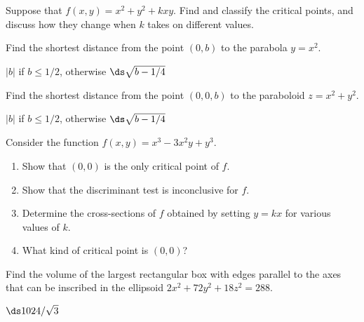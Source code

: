 \begin{enumialphparenastyle}
\begin{ex}
Suppose that $f(x,y)=x^2+y^2+kxy$. Find and classify the
  critical points, and discuss how they change when $k$ takes on
  different values.
\end{ex}

\begin{ex}
Find the shortest distance from the point $(0,b)$ to the
  parabola $y=x^2$.
\begin{sol}
$|b|$ if $b\le1/2$, otherwise $\ds\sqrt{b-1/4}$
\end{sol}
\end{ex}

\begin{ex}
Find the shortest distance from the point $(0,0,b)$ to the
  paraboloid $z=x^2+y^2$.
\begin{sol}
$|b|$ if $b\le1/2$, otherwise $\ds\sqrt{b-1/4}$
\end{sol}
\end{ex}

\begin{ex}
Consider the function $f(x,y)=x^3-3x^2y+y^3$.

\begin{enumerate}
	\item Show that $(0,0)$ is the only critical point of $f$.
	\item Show that the discriminant test is inconclusive for $f$.  
	\item Determine the cross-sections of $f$ obtained by setting $y=kx$ for
	  various values of $k$.
	\item What kind of critical point is $(0,0)$?
\end{enumerate}
\end{ex}

\begin{ex}
Find the volume of the largest rectangular box with edges
  parallel to the axes that can be inscribed in the ellipsoid
  $2x^2+72y^2+18z^2=288$.
\begin{sol}
$\ds 1024/\sqrt3$
\end{sol}
\end{ex}

\end{enumialphparenastyle}